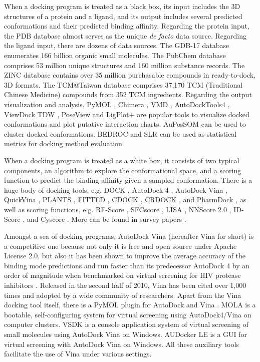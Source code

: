 When a docking program is treated as a black box, its input includes the 3D structures of a protein and a ligand, and its output includes several predicted conformations and their predicted binding affinity. Regarding the protein input, the PDB database \citep{539,537} almost serves as the unique \textit{de facto} data source. Regarding the ligand input, there are dozens of data sources. The GDB-17 database \citep{1276} enumerates 166 billion organic small molecules. The PubChem database \citep{526} comprises 53 million unique structures and 160 million substance records. The ZINC database \citep{532,1178} contains over 35 million purchasable compounds in ready-to-dock, 3D formats. The TCM@Taiwan database \citep{528} comprises 37,170 TCM (Traditional Chinese Medicine) compounds from 352 TCM ingredients. Regarding the output visualization and analysis, PyMOL \citep{1221}, Chimera \citep{1219}, VMD \citep{1220}, AutoDockTools4 \citep{596}, ViewDock TDW \citep{559}, PoseView \citep{748} and LigPlot+ \citep{951} are popular tools to visualize docked conformations and plot putative interaction charts. AuPosSOM \citep{598} can be used to cluster docked conformations. BEDROC \citep{490} and SLR \citep{489} can be used as statistical metrics for docking method evaluation.

When a docking program is treated as a white box, it consists of two typical components, an algorithm to explore the conformational space, and a scoring function to predict the binding affinity given a sampled conformation. There is a huge body of docking tools, e.g. DOCK \citep{1222,1445}, AutoDock 4 \citep{596}, AutoDock Vina \citep{595}, QuickVina \citep{1193}, PLANTS \citep{610,607,779}, FITTED \citep{602,603}, CDOCK \citep{1224}, CRDOCK \citep{1200}, and PharmDock \citep{1376}, as well as scoring functions, e.g. RF-Score \citep{564,1370}, SFCscore \citep{581,1347}, LISA \citep{775}, NNScore 2.0 \citep{977}, ID-Score \cite{1305}, and Cyscore \cite{1372}. More can be found in survey papers \citep{493,922}.

Amongst a sea of docking programs, AutoDock Vina \citep{595} (hereafter Vina for short) is a competitive one because not only it is free and open source under Apache License 2.0, but also it has been shown to improve the average accuracy of the binding mode predictions \citep{595} and run faster than its predecessor AutoDock 4 \citep{596} by an order of magnitude when benchmarked on virtual screening for HIV protease inhibitors \citep{556}. Released in the second half of 2010, Vina has been cited over 1,000 times and adopted by a wide community of researchers. Apart from the Vina docking tool itself, there is a PyMOL plugin for AutoDock and Vina \citep{609}. MOLA \citep{773} is a bootable, self-configuring system for virtual screening using AutoDock4/Vina on computer clusters. VSDK \citep{1268} is a console application system of virtual screening of small molecules using AutoDock Vina on Windows. AUDocker LE \citep{1250} is a GUI for virtual screening with AutoDock Vina on Windows. All these auxiliary tools facilitate the use of Vina under various settings.%

